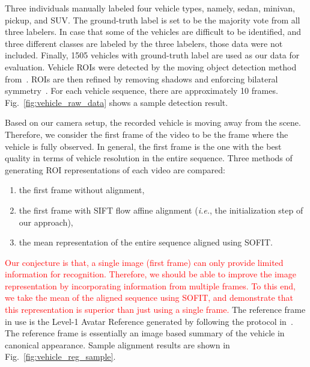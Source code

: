 \documentclass[10pt,journal]{IEEEtran}
\newcommand{\Songfan}[1]{\textcolor{red}{#1}}
\begin{document}
Three individuals manually labeled four vehicle types, namely, sedan, minivan, pickup, and SUV. The ground-truth label is set to be the majority vote from all three labelers. In case that some of the vehicles are difficult to be identified, and three different classes are labeled by the three labelers, those data were not included. Finally, 1505 vehicles with ground-truth label are used as our data for evaluation. Vehicle ROIs were detected by the moving object detection method from~\cite{Thakoor05}. ROIs are then refined by removing shadows and enforcing bilateral symmetry~\cite{Thakoor13}. For each vehicle sequence, there are approximately 10 frames. Fig.~\ref{fig:vehicle_raw_data} shows a sample detection result.  

Based on our camera setup, the recorded vehicle is moving away from the scene. Therefore, we consider the first frame of the video to be the frame where the vehicle is fully observed. In general, the first frame is the one with the best quality in terms of vehicle resolution in the entire sequence. Three methods of generating ROI representations of each video are compared: 
\begin{enumerate}
\item the first frame without alignment, 
\item the first frame with SIFT flow affine alignment (\textit{i.e.}, the initialization step of our approach), 
\item the mean representation of the entire sequence aligned using SOFIT. 
\end{enumerate}

\Songfan{Our conjecture is that, a single image (first frame) can only provide limited information for recognition. Therefore, we should be able to improve the image representation by incorporating information from multiple frames. To this end, we take the mean of the aligned sequence using SOFIT, and demonstrate that this representation is superior than just using a single frame.} The reference frame in use is the Level-1 Avatar Reference generated by following the protocol in~\cite{Yang_SMCB12}. The reference frame is essentially an image based summary of the vehicle in canonical appearance. Sample alignment results are shown in Fig.~\ref{fig:vehicle_reg_sample}.
\end{document}
